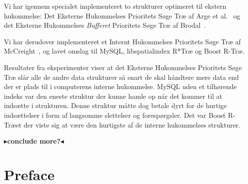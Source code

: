 \documentclass[twoside,11pt,openright]{report}
\newcommand{\todo}[1]{{\color[rgb]{.5,0,0}\textbf{$\blacktriangleright$#1$\blacktriangleleft$}}}
\begin{document}
Vi har igennem specialet implementeret to strukturer optimeret til ekstern hukommelse: Det Eksterne Hukommelses Prioritets S{\o}ge Tr{\ae} af Arge et al.~\cite{arge_samoladas_vitter_1999} og det Eksterne Hukommelses \textit{Bufferet} Prioritets S{\o}ge Tr{\ae} af Brodal~\cite{DBLP:journals/corr/Brodal15}.

Vi har derudover implementeret et Internt Hukommelses Prioritets S{\o}ge Tr{\ae} af McCreight~\cite{DBLP:journals/siamcomp/McCreight85}, og lavet omslag til MySQL, libspatialindex R*Tr{\ae} og Boost R-Tr{\ae}.

Resultater fra eksperimenter viser at det Eksterne Hukommelses Prioritets S{\o}ge Tr{\ae} sl{\aa}r alle de andre data strukturer s{\aa} snart de skal h{\aa}ndtere mere data end der er plads til i computerens interne hukommelse. MySQL uden et tilh{\o}rende indeks var den eneste struktur der kunne hamle op n{\aa}r det kommer til at inds{\ae}tte i strukturen. Denne struktur m{\aa}tte dog betale dyrt for de hurtige inds{\ae}ttelser i form af langsomme slettelser og foresp{\o}rgsler. Det var Boost R-Tr{\ae}et der viste sig at v{\ae}re den hurtigste af de interne hukommelses strukturer.

\todo{conclude more?}

\tableofcontents

\chapter*{Preface}
\label{chp:preface}
\end{document}
